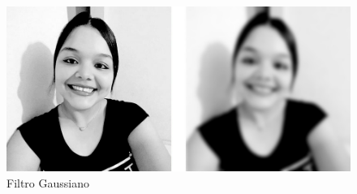 		\begin{figure}[!htb]
			\centering
			\includegraphics[width=\columnwidth]{img/19-gaussiano.jpg}
			\caption{Filtro Gaussiano}
		\end{figure}
		
		\lstset{language=python}
		{\tiny }
		
		
		